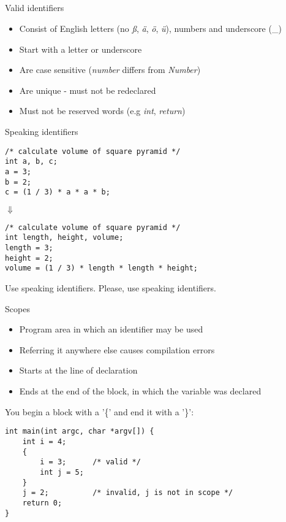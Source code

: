\subsection{}
\begin{frame}{Valid identifiers}
	\begin{itemize}
		\item Consist of English letters (no \textit{ß}, \textit{ä}, \textit{ö}, \textit{ü}), numbers and underscore (\_)
		\item Start with a letter or underscore
		\item Are case sensitive (\textit{number} differs from \textit{Number})
		\item Are unique - must not be redeclared
		\item Must not be reserved words (e.g \textit{int}, \textit{return})
	\end{itemize}
\end{frame}
\begin{frame}[fragile]{Speaking identifiers}
	\begin{lstlisting}
/* calculate volume of square pyramid */
int a, b, c;
a = 3;
b = 2;
c = (1 / 3) * a * a * b;
\end{lstlisting}
\centering
$\Downarrow$
	\begin{lstlisting}
/* calculate volume of square pyramid */
int length, height, volume;
length = 3;
height = 2;
volume = (1 / 3) * length * length * height;
\end{lstlisting}
\end{frame}
\begin{frame}{Use speaking identifiers.}
	\LARGE
	\centering
	Please, use speaking identifiers.\footnotemark
	
\end{frame}
\begin{frame}[fragile]{Scopes}
	\begin{itemize}
		\item Program area in which an identifier may be used
		\item Referring it anywhere else causes compilation errors
		\item Starts at the line of declaration
		\item Ends at the end of the block, in which the variable was declared
	\end{itemize}
	You begin a block with a '\{' and end it with a '\}':
	\begin{lstlisting}
int main(int argc, char *argv[]) {
	int i = 4;
	{
		i = 3;		/* valid */
		int j = 5;
	}
	j = 2;			/* invalid, j is not in scope */
	return 0;
}
\end{lstlisting}
\end{frame}
